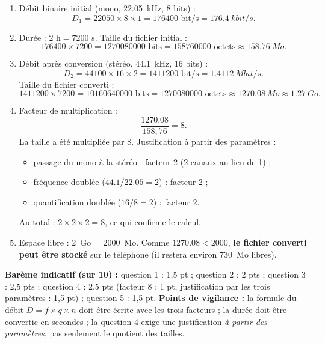 \documentclass[11pt]{article}
\begin{document}
\begin{corrige}
\begin{enumerate}
\item Débit binaire initial (mono, \SI{22,05}{kHz}, 8 bits) :
\[ D_1 = \num{22050} \times 8 \times 1 = \num{176400} \text{ bit/s} = \SI{176,4}{kbit/s}. \]
\item Durée : $2 \text{ h} = \num{7200}$ s. Taille du fichier initial :
\[ \num{176400} \times 7200 = \num{1270080000} \text{ bits} = \num{158760000} \text{ octets} \approx \SI{158,76}{Mo}. \]
\item Débit après conversion (stéréo, \SI{44,1}{kHz}, 16 bits) :
\[ D_2 = \num{44100} \times 16 \times 2 = \num{1411200} \text{ bit/s} = \SI{1,4112}{Mbit/s}. \]
Taille du fichier converti :
\[ \num{1411200} \times 7200 = \num{10160640000} \text{ bits} = \num{1270080000} \text{ octets} \approx \SI{1270,08}{Mo} \approx \SI{1,27}{Go}. \]
\item Facteur de multiplication :
\[ \frac{\num{1270,08}}{158,76} = 8. \]
La taille a été multipliée par 8. Justification à partir des paramètres :
\begin{itemize}
\item passage du mono à la stéréo : facteur 2 (2 canaux au lieu de 1) ;
\item fréquence doublée ($\num{44,1}/\num{22,05} = 2$) : facteur 2 ;
\item quantification doublée ($16/8 = 2$) : facteur 2.
\end{itemize}
Au total : $2 \times 2 \times 2 = 8$, ce qui confirme le calcul.
\item Espace libre : \SI{2}{Go} = \SI{2000}{Mo}. Comme $\num{1270,08} < \num{2000}$, \textbf{le fichier converti peut être stocké} sur le téléphone (il restera environ \SI{730}{Mo} libres).
\end{enumerate}
\textbf{Barème indicatif (sur 10) :} question 1 : 1,5 pt ; question 2 : 2 pts ; question 3 : 2,5 pts ; question 4 : 2,5 pts (facteur 8 : 1 pt, justification par les trois paramètres : 1,5 pt) ; question 5 : 1,5 pt.
\textbf{Points de vigilance :} la formule du débit $D = f \times q \times n$ doit être écrite avec les trois facteurs ; la durée doit être convertie en secondes ; la question 4 exige une justification \emph{à partir des paramètres}, pas seulement le quotient des tailles.
\end{corrige}
\end{document}
